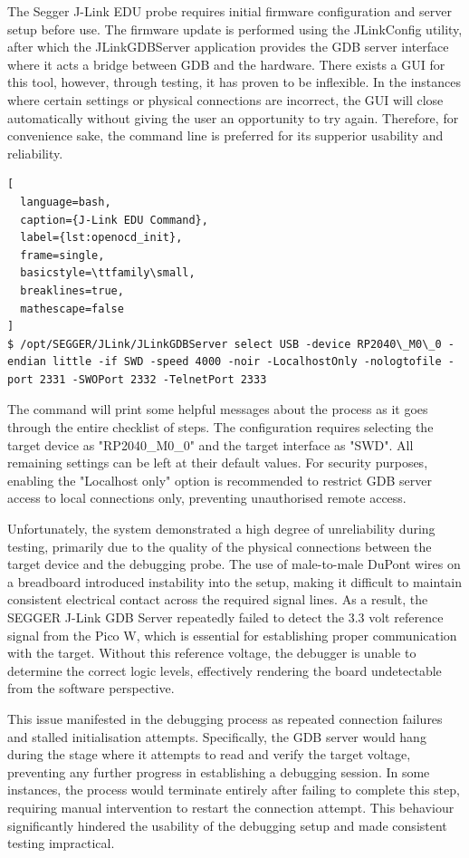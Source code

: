 The Segger J-Link EDU probe requires initial firmware configuration and server setup before use. The firmware update is performed using the JLinkConfig utility, after which the JLinkGDBServer application provides the GDB server interface where it acts a bridge between GDB and the hardware. There exists a GUI for this tool, however, through testing, it has proven to be inflexible. In the instances where certain settings or physical connections are incorrect, the GUI will close automatically without giving the user an opportunity to try again. Therefore, for convenience sake, the command line is preferred for its supperior usability and reliability.

\begin{lstlisting}[
  language=bash,
  caption={J-Link EDU Command},
  label={lst:openocd_init},
  frame=single,
  basicstyle=\ttfamily\small,
  breaklines=true,
  mathescape=false
]
$ /opt/SEGGER/JLink/JLinkGDBServer select USB -device RP2040\_M0\_0 -endian little -if SWD -speed 4000 -noir -LocalhostOnly -nologtofile -port 2331 -SWOPort 2332 -TelnetPort 2333
\end{lstlisting}

The command will print some helpful messages about the process as it goes through the entire checklist of steps. The configuration requires selecting the target device as "RP2040\_M0\_0" and the target interface as "SWD". All remaining settings can be left at their default values. For security purposes, enabling the "Localhost only" option is recommended to restrict GDB server access to local connections only, preventing unauthorised remote access.

Unfortunately, the system demonstrated a high degree of unreliability during testing, primarily due to the quality of the physical connections between the target device and the debugging probe. The use of male-to-male DuPont wires on a breadboard introduced instability into the setup, making it difficult to maintain consistent electrical contact across the required signal lines. As a result, the SEGGER J-Link GDB Server repeatedly failed to detect the 3.3 volt reference signal from the Pico W, which is essential for establishing proper communication with the target. Without this reference voltage, the debugger is unable to determine the correct logic levels, effectively rendering the board undetectable from the software perspective.

This issue manifested in the debugging process as repeated connection failures and stalled initialisation attempts. Specifically, the GDB server would hang during the stage where it attempts to read and verify the target voltage, preventing any further progress in establishing a debugging session. In some instances, the process would terminate entirely after failing to complete this step, requiring manual intervention to restart the connection attempt. This behaviour significantly hindered the usability of the debugging setup and made consistent testing impractical.

